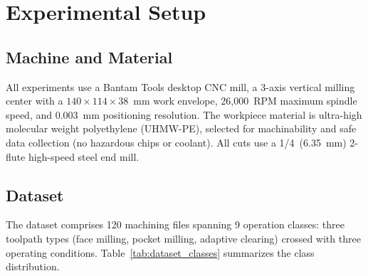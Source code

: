 \section{Experimental Setup}
\label{sec:experimental_setup}

\subsection{Machine and Material}
\label{sec:machine}

All experiments use a Bantam Tools desktop CNC mill, a 3-axis vertical milling center with a $140 \times 114 \times 38$~mm work envelope, 26,000~RPM maximum spindle speed, and 0.003~mm positioning resolution.
The workpiece material is ultra-high molecular weight polyethylene (UHMW-PE), selected for machinability and safe data collection (no hazardous chips or coolant).
All cuts use a 1/4\textquotesingle\textquotesingle\ (6.35~mm) 2-flute high-speed steel end mill.

\subsection{Dataset}
\label{sec:dataset}

The dataset comprises 120 machining files spanning 9 operation classes: three toolpath types (face milling, pocket milling, adaptive clearing) crossed with three operating conditions.
Table~\ref{tab:dataset_classes} summarizes the class distribution.

